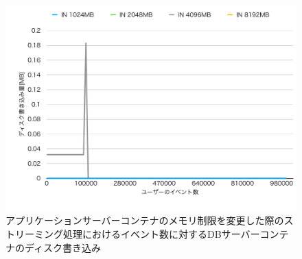 \documentclass[../../../../../main]{subfiles}
\begin{document}
    \begin{figure}[H]
        \centering
        \includegraphics[width=12cm]{graph}
        \caption{アプリケーションサーバーコンテナのメモリ制限を変更した際のストリーミング処理におけるイベント数に対するDBサーバーコンテナのディスク書き込み}
        \label{fig:stream-change-app-memory-limit-db-disk-in-app_4_db_1_1024}
    \end{figure}
\end{document}
